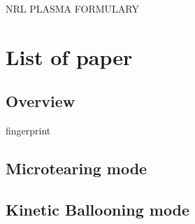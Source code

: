 NRL PLASMA FORMULARY\cite{formula}

\section{List of paper}

\subsection{Overview}

fingerprint

\subsection{Microtearing mode}

\subsection{Kinetic Ballooning mode}

